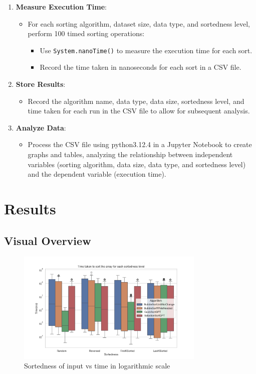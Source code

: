 \documentclass[unicode,11pt,a4paper,oneside,numbers=endperiod,openany]{scrartcl}
\begin{document}
\begin{enumerate}
        \item \textbf{Measure Execution Time}:
        \begin{itemize}
            \item For each sorting algorithm, dataset size, data type, and sortedness level, perform 100 timed sorting operations:
            \begin{itemize}
                \item Use \texttt{System.nanoTime()} to measure the execution time for each sort.
                \item Record the time taken in nanoseconds for each sort in a CSV file.
            \end{itemize}
        \end{itemize}
    
        \item \textbf{Store Results}:
        \begin{itemize}
            \item Record the algorithm name, data type, data size, sortedness level, and time taken for each run in the CSV file to allow for subsequent analysis.
        \end{itemize}
    
        \item \textbf{Analyze Data}:
        \begin{itemize}
            \item Process the CSV file using python3.12.4 in a Jupyter Notebook to create graphs and tables, analyzing the relationship between independent variables (sorting algorithm, data size, data type, and sortedness level) and the dependent variable (execution time).
        \end{itemize}
    \end{enumerate}


\section{Results}

    \subsection{Visual Overview}


    \begin{figure}[htbp]
        \centering
        \includegraphics[width=0.8\textwidth]{./fig/hip1.png}
        \caption{Sortedness of input vs time in logarithmic scale}
        \label{fig:hip1}
    \end{figure}
\end{document}
